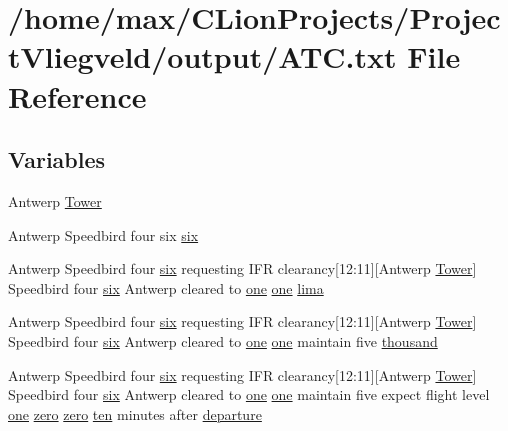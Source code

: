 \hypertarget{ATC_8txt}{}\section{/home/max/\+C\+Lion\+Projects/\+Project\+Vliegveld/output/\+A\+TC.txt File Reference}
\label{ATC_8txt}
\subsection*{Variables}
\begin{DoxyCompactItemize}
\item 
Antwerp \hyperlink{ATC_8txt_a82e4fe311db1d84af6e8e53fd0d1025d}{Tower}
\item 
Antwerp Speedbird four six \hyperlink{ATC_8txt_a42ba60ceca6351d258f16b06edec96ac}{six}
\item 
Antwerp Speedbird four \hyperlink{happyDay5ExpectedATC_8txt_a57978282a95204080c8ffb626c7d0bd5}{six} requesting I\+FR clearancy\mbox{[}12\+:11\mbox{]}\mbox{[}Antwerp \hyperlink{test_2testOutput_2log_8txt_ade5c2a9317c664c53d015e41bdc32393}{Tower}\mbox{]} Speedbird four \hyperlink{happyDay5ExpectedATC_8txt_a57978282a95204080c8ffb626c7d0bd5}{six} Antwerp cleared to \hyperlink{happyDay5ExpectedATC_8txt_a1bdf675837626f29e859d1a241701d26}{one} \hyperlink{happyDay5ExpectedATC_8txt_a1bdf675837626f29e859d1a241701d26}{one} \hyperlink{ATC_8txt_a4f581ea086ea8bcc78589348ca970791}{lima}
\item 
Antwerp Speedbird four \hyperlink{happyDay5ExpectedATC_8txt_a57978282a95204080c8ffb626c7d0bd5}{six} requesting I\+FR clearancy\mbox{[}12\+:11\mbox{]}\mbox{[}Antwerp \hyperlink{test_2testOutput_2log_8txt_ade5c2a9317c664c53d015e41bdc32393}{Tower}\mbox{]} Speedbird four \hyperlink{happyDay5ExpectedATC_8txt_a57978282a95204080c8ffb626c7d0bd5}{six} Antwerp cleared to \hyperlink{happyDay5ExpectedATC_8txt_a1bdf675837626f29e859d1a241701d26}{one} \hyperlink{happyDay5ExpectedATC_8txt_a1bdf675837626f29e859d1a241701d26}{one} maintain five \hyperlink{ATC_8txt_ae9f8073b6a527ed0b92dd8164f312e3f}{thousand}
\item 
Antwerp Speedbird four \hyperlink{happyDay5ExpectedATC_8txt_a57978282a95204080c8ffb626c7d0bd5}{six} requesting I\+FR clearancy\mbox{[}12\+:11\mbox{]}\mbox{[}Antwerp \hyperlink{test_2testOutput_2log_8txt_ade5c2a9317c664c53d015e41bdc32393}{Tower}\mbox{]} Speedbird four \hyperlink{happyDay5ExpectedATC_8txt_a57978282a95204080c8ffb626c7d0bd5}{six} Antwerp cleared to \hyperlink{happyDay5ExpectedATC_8txt_a1bdf675837626f29e859d1a241701d26}{one} \hyperlink{happyDay5ExpectedATC_8txt_a1bdf675837626f29e859d1a241701d26}{one} maintain five expect flight level \hyperlink{happyDay5ExpectedATC_8txt_a1bdf675837626f29e859d1a241701d26}{one} \hyperlink{happyDay5ExpectedATC_8txt_a1cdb3e947394a8f9b50cff125d86fb29}{zero} \hyperlink{happyDay5ExpectedATC_8txt_a1cdb3e947394a8f9b50cff125d86fb29}{zero} \hyperlink{happyDay5ExpectedATC_8txt_ab9794f8235db42812d8ddd9368cb321e}{ten} minutes after \hyperlink{ATC_8txt_af9835824e50bb6ca59bed75129f137e3}{departure}

\end{DoxyCompactItemize}
